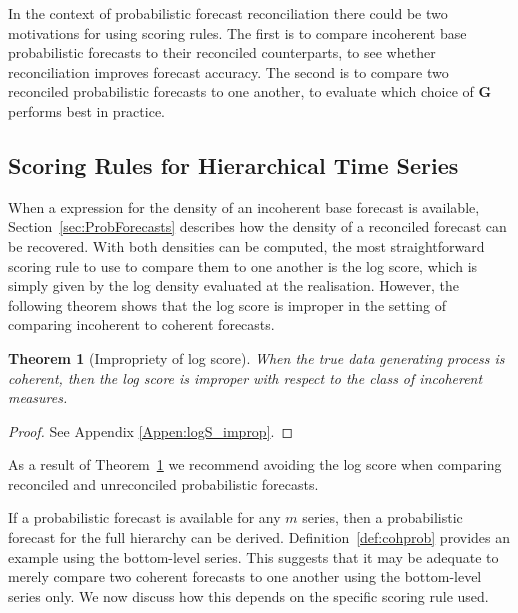 \documentclass[12pt]{article}
\newtheorem{theo}{Theorem}[section]
\theoremstyle{definition}
\begin{document}
In the context of probabilistic forecast reconciliation there could be two motivations for using scoring rules. The first is to compare incoherent base probabilistic forecasts to their reconciled counterparts, to see whether reconciliation improves forecast accuracy. The second is to compare two reconciled probabilistic forecasts to one another, to evaluate which choice of $\bm{G}$ performs best in practice.

\subsection{Scoring Rules for Hierarchical Time Series}

When a expression for the density of an incoherent base forecast is available, Section~\ref{sec:ProbForecasts} describes how the density of a reconciled forecast can be recovered.  With both densities can be computed, the most straightforward scoring rule to use to compare them to one another is the log score, which is simply given by the log density evaluated at the realisation.  However, the following theorem shows that the log score is improper in the setting of comparing incoherent to coherent forecasts.

\begin{theo}[Impropriety of log score]\label{theo:logS_improp}
	When the true data generating process is coherent, then the log score is improper with respect to the class of incoherent measures.
\end{theo}

\begin{proof}
	See Appendix \ref{Appen:logS_improp}.
\end{proof}

As a result of Theorem~\ref{theo:logS_improp} we recommend avoiding the log score when comparing reconciled and unreconciled probabilistic forecasts.

If a probabilistic forecast is available for any $m$ series, then a probabilistic forecast for the full hierarchy can be derived.  Definition~\ref{def:cohprob} provides an example using the bottom-level series. This suggests that it may be adequate to merely compare two coherent forecasts to one another using the bottom-level series only. We now discuss how this depends on the specific scoring rule used.
\end{document}
